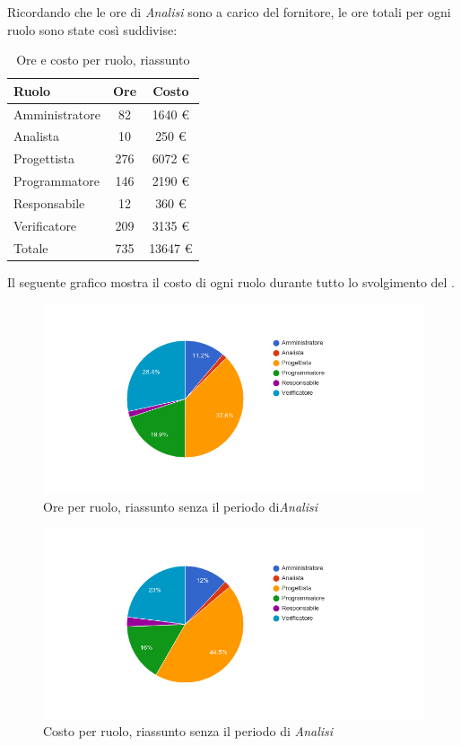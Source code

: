 Ricordando che le ore di \textit{Analisi} sono a carico del fornitore, le ore totali per ogni ruolo sono state così suddivise:
\begin{table}[H]
	\centering
	\begin{tabular}{ l c c }
		\textbf{Ruolo} & \textbf{Ore} & \textbf{Costo} \\
		\hline
		Amministratore & 82 & 1640 \euro{} \\
		Analista & 10 & 250 \euro{} \\
		Progettista & 276 & 6072 \euro{} \\
		Programmatore & 146 & 2190 \euro{} \\
		Responsabile & 12 & 360 \euro{} \\
		Verificatore & 209 & 3135 \euro{} \\
		\hline
		Totale & 735 & 13647 \euro{} \\
		\hline
	\end{tabular}
	\caption{Ore e costo per ruolo, riassunto }
\end{table}

Il seguente grafico mostra il costo di ogni ruolo durante tutto lo svolgimento del .

\begin{figure}[H]
  \begin{center}
    \includegraphics[width=15cm]{res/img/prospettoEconomico/orePerRuoloRiassuntoSenzaAnalisi.png}
  \caption{Ore per ruolo, riassunto  senza il periodo di\textit{Analisi}}
  \end{center} 
\end{figure}  

\begin{figure}[H]
  \begin{center}
    \includegraphics[width=15cm]{res/img/prospettoEconomico/costoPerRuoloRiassuntoSenzaAnalisi.png}
  \caption{Costo per ruolo, riassunto  senza il periodo di \textit{Analisi}}
  \end{center} 
\end{figure}  

\newpage